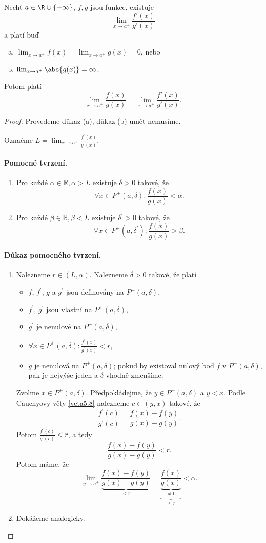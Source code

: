 \begin{veta} \label{veta5.9}
Nechť $a\in\R\cup\{-\infty\}$, $f,g$ jsou funkce, existuje
$$\displaystyle \lim_{x\to a^+}\frac{f'(x)}{g'(x)}$$ a platí buď
\begin{enumerate}[(a)]
  \item $\lim_{x\to a^+} f(x)=\lim_{x\to a^+} g(x)=0$, nebo
  \item $\lim_{x\to a^+} \abs{g(x)}=\infty$.
\end{enumerate}
Potom platí $$ \lim_{x\to a^+}\frac{f(x)}{g(x)}=\lim_{x\to a^+}\frac{f'(x)}{g'(x)}.$$
\end{veta}

\begin{proof}
	Provedeme důkaz (a), důkaz (b) umět nemusíme.
	\par Označme $L=\lim_{x\to a^+} \frac{f^\prime(x)}{g^\prime(x)}.$
	\paragraph{Pomocné tvrzení.}
	\begin{enumerate}
		\item[(i)] Pro každé $\alpha \in \mathbb R ,\alpha > L$ existuje $\delta > 0$ takové, že
		$$
		    \forall x \in P^+(a,\delta):\frac{f(x)}{g(x)}<\alpha.
		$$
		\item[(ii)] Pro každé $\beta \in \mathbb R , \beta < L$ existuje $\delta^\prime>0$ takové,
		že
		$$
		    \forall x \in P^+(a,\delta^\prime):\frac{f(x)}{g(x)}>\beta.
		$$
	\end{enumerate}
		\paragraph{Důkaz pomocného tvrzení.}
		\begin{enumerate}
			\item[(i)] Nalezneme $r\in (L,\alpha)$. Nalezneme $\delta > 0$ takové, že platí
			\begin{itemize}
				\item $f$, $f^\prime$, $g$ a $g^\prime$ jsou definovány na $P^+(a,\delta)$,
				\item $f^\prime$, $g^\prime$ jsou vlastní na $P^+(a,\delta)$,
				\item $g^\prime$ je nenulové na $P^+(a,\delta)$,
				\item $\forall x \in P^+(a,\delta):\frac{f^\prime(x)}{g^\prime(x)}<r$,
				\item $g$ je nenulová na $P^+(a,\delta)$; pokud by existoval nulový bod $f$ v
				$P^+(a,\delta)$, pak je nejvýše jeden a $\delta$ vhodně zmenšíme.
			\end{itemize}
		Zvolme $x\in P^+(a,\delta)$. Předpokládejme, že $y \in P^+(a,\delta)$ a $y<x$. Podle Cauchyovy
		věty \ref{veta5.8} nalezneme $c \in (y,x)$ takové, že
		$$
  \frac{f^\prime(c)}{g^\prime(c)}=\frac{f(x)-f(y)}{g(x)-g(y)}.
		$$
		Potom $\frac{f^\prime(c)}{g^\prime(c)}<r$, a tedy
		$$
  \frac{f(x)-f(y)}{g(x)-g(y)}<r.
		$$
		Potom máme, že
		$$
  \lim_{y\to a^+} \frac{f(x)-f(y)}{\underbrace{g(x)-g(y)}_{<r}}=\underbrace{\frac{f(x)}{\underbrace{g(x)}_{\ne 0}}}_{\leq r}<\alpha.
		$$
		\item[(ii)] Dokážeme analogicky.
	\end{enumerate}

\end{proof}
